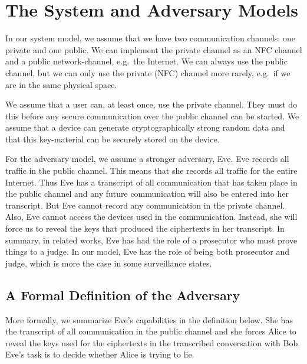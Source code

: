 \section{The System and Adversary Models}
\label{ModelsOverview}

In our system model, we assume that we have two communication channels: one 
private and one public.
We can implement the private channel as an \ac{NFC} channel and a public 
network-channel, e.g.\ the Internet.
We can always use the public channel, but we can only use the private 
(\ac{NFC}) channel more rarely, e.g.\ if we are in the same physical space.

We assume that a user can, at least once, use the private channel.
They must do this before any secure communication over the public channel can 
be started.
We assume that a device can generate cryptographically strong random data and 
that this key-material can be securely stored on the device.

For the adversary model, we assume a stronger adversary, Eve.
Eve records all traffic in the public channel.
This means that she records all traffic for the entire Internet.
Thus Eve has a transcript of all communication that has taken place in the 
public channel and any future communication will also be entered into her 
transcript.
But Eve cannot record any communication in the private channel.
Also, Eve cannot access the devices used in the communication.
Instead, she will force us to reveal the keys that produced the ciphertexts in 
her transcript.
In summary, in related works, Eve has had the role of a prosecutor who must 
prove things to a judge.
In our model, Eve has the role of being both prosecutor and judge, which is 
more the case in some surveillance states.

\subsection{A Formal Definition of the Adversary}
\label{FormalAdversary}

More formally, we summarize Eve's capabilities in the definition below.
She has the transcript of all communication in the public channel and she 
forces Alice to reveal the keys used for the ciphertexts in the transcribed
conversation with Bob.
Eve's task is to decide whether Alice is trying to lie.

